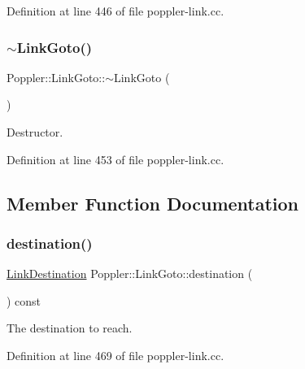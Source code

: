 Definition at line 446 of file poppler-\/link.\+cc.

\mbox{\label{class_poppler_1_1_link_goto_af2947099da72e0b102a62313f7c6d211}} 
\subsubsection{\texorpdfstring{$\sim$\+Link\+Goto()}{~LinkGoto()}}
{\footnotesize\ttfamily Poppler\+::\+Link\+Goto\+::$\sim$\+Link\+Goto (\begin{DoxyParamCaption}{ }\end{DoxyParamCaption})}

Destructor. 

Definition at line 453 of file poppler-\/link.\+cc.



\subsection{Member Function Documentation}
\mbox{\label{class_poppler_1_1_link_goto_aa09835c861c3c0ef32555c25f6325a22}} 
\subsubsection{\texorpdfstring{destination()}{destination()}}
{\footnotesize\ttfamily \hyperlink{class_poppler_1_1_link_destination}{Link\+Destination} Poppler\+::\+Link\+Goto\+::destination (\begin{DoxyParamCaption}{ }\end{DoxyParamCaption}) const}

The destination to reach. 

Definition at line 469 of file poppler-\/link.\+cc.

\mbox{\label{class_poppler_1_1_link_goto_a2ca06b1b69c22b92490750b6cf7487f8}} 

